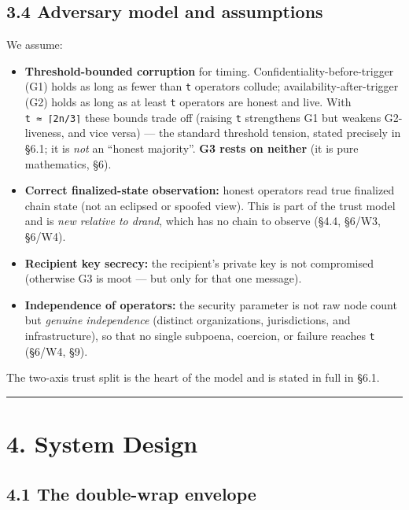 \documentclass[
  11pt,
]{article}
\providecommand{\tightlist}{%
  \setlength{\itemsep}{0pt}\setlength{\parskip}{0pt}}
\begin{document}
\subsection{3.4 Adversary model and
assumptions}\label{adversary-model-and-assumptions}

We assume:

\begin{itemize}
\tightlist
\item
  \textbf{Threshold-bounded corruption} for timing.
  Confidentiality-before-trigger (G1) holds as long as fewer than
  \texttt{t} operators collude; availability-after-trigger (G2) holds as
  long as at least \texttt{t} operators are honest and live. With
  \texttt{t\ ≈\ ⌈2n/3⌉} these bounds trade off (raising \texttt{t}
  strengthens G1 but weakens G2-liveness, and vice versa) --- the
  standard threshold tension, stated precisely in §6.1; it is \emph{not}
  an ``honest majority''. \textbf{G3 rests on neither} (it is pure
  mathematics, §6).
\item
  \textbf{Correct finalized-state observation:} honest operators read
  true finalized chain state (not an eclipsed or spoofed view). This is
  part of the trust model and is \emph{new relative to drand}, which has
  no chain to observe (§4.4, §6/W3, §6/W4).
\item
  \textbf{Recipient key secrecy:} the recipient's private key is not
  compromised (otherwise G3 is moot --- but only for that one message).
\item
  \textbf{Independence of operators:} the security parameter is not raw
  node count but \emph{genuine independence} (distinct organizations,
  jurisdictions, and infrastructure), so that no single subpoena,
  coercion, or failure reaches \texttt{t} (§6/W4, §9).
\end{itemize}

The two-axis trust split is the heart of the model and is stated in full
in §6.1.

\begin{center}\rule{0.5\linewidth}{0.5pt}\end{center}

\section{4. System Design}\label{system-design}

\subsection{4.1 The double-wrap
envelope}\label{the-double-wrap-envelope}
\end{document}
